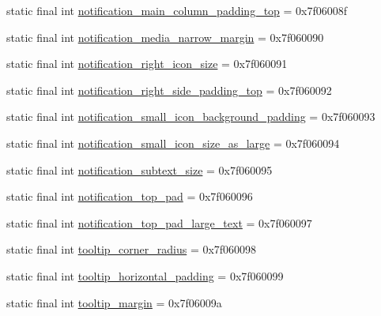 \begin{DoxyCompactItemize}
static final int \mbox{\hyperlink{classandroid_1_1support_1_1v7_1_1appcompat_1_1_r_1_1dimen_af54bcd28e3b9be237137caadc803e650}{notification\+\_\+main\+\_\+column\+\_\+padding\+\_\+top}} = 0x7f06008f
\item 
static final int \mbox{\hyperlink{classandroid_1_1support_1_1v7_1_1appcompat_1_1_r_1_1dimen_a20fbbaea6c3a0c44f12f50b8ffbf709c}{notification\+\_\+media\+\_\+narrow\+\_\+margin}} = 0x7f060090
\item 
static final int \mbox{\hyperlink{classandroid_1_1support_1_1v7_1_1appcompat_1_1_r_1_1dimen_a66bc270c52a9288abdf7fd72d9cfa019}{notification\+\_\+right\+\_\+icon\+\_\+size}} = 0x7f060091
\item 
static final int \mbox{\hyperlink{classandroid_1_1support_1_1v7_1_1appcompat_1_1_r_1_1dimen_a9b2845b7b3037785d47ed7992607a328}{notification\+\_\+right\+\_\+side\+\_\+padding\+\_\+top}} = 0x7f060092
\item 
static final int \mbox{\hyperlink{classandroid_1_1support_1_1v7_1_1appcompat_1_1_r_1_1dimen_aad972e44f05ad45d730db47c1ad1b4d5}{notification\+\_\+small\+\_\+icon\+\_\+background\+\_\+padding}} = 0x7f060093
\item 
static final int \mbox{\hyperlink{classandroid_1_1support_1_1v7_1_1appcompat_1_1_r_1_1dimen_af52f53608c63a8bbd9bd8701a3e8da49}{notification\+\_\+small\+\_\+icon\+\_\+size\+\_\+as\+\_\+large}} = 0x7f060094
\item 
static final int \mbox{\hyperlink{classandroid_1_1support_1_1v7_1_1appcompat_1_1_r_1_1dimen_a22988b81668da9a88c915c93f07a65dc}{notification\+\_\+subtext\+\_\+size}} = 0x7f060095
\item 
static final int \mbox{\hyperlink{classandroid_1_1support_1_1v7_1_1appcompat_1_1_r_1_1dimen_ae060f34af02cf912b87ebcda2a9619e9}{notification\+\_\+top\+\_\+pad}} = 0x7f060096
\item 
static final int \mbox{\hyperlink{classandroid_1_1support_1_1v7_1_1appcompat_1_1_r_1_1dimen_ac95b1a932a72277a2a90b0ed26ee66ac}{notification\+\_\+top\+\_\+pad\+\_\+large\+\_\+text}} = 0x7f060097
\item 
static final int \mbox{\hyperlink{classandroid_1_1support_1_1v7_1_1appcompat_1_1_r_1_1dimen_ab101a93216f889202e7b50ad1ca5976b}{tooltip\+\_\+corner\+\_\+radius}} = 0x7f060098
\item 
static final int \mbox{\hyperlink{classandroid_1_1support_1_1v7_1_1appcompat_1_1_r_1_1dimen_a81be92348ba30432978e549e2330b8ca}{tooltip\+\_\+horizontal\+\_\+padding}} = 0x7f060099
\item 
static final int \mbox{\hyperlink{classandroid_1_1support_1_1v7_1_1appcompat_1_1_r_1_1dimen_a7ed8b140f62a9b032f5981baf889468e}{tooltip\+\_\+margin}} = 0x7f06009a

\end{DoxyCompactItemize}
